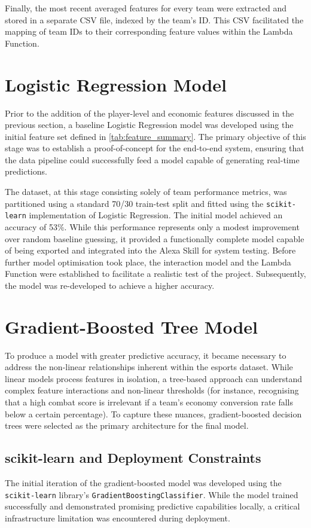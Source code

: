 Finally, the most recent averaged features for every team were extracted and stored in a separate CSV file, indexed by the team's ID. This CSV facilitated the mapping of team IDs to their corresponding feature values within the Lambda Function.

\section{Logistic Regression Model}
Prior to the addition of the player-level and economic features discussed in the previous section, a baseline Logistic Regression model was developed using the initial feature set defined in \autoref{tab:feature_summary}. The primary objective of this stage was to establish a proof-of-concept for the end-to-end system, ensuring that the data pipeline could successfully feed a model capable of generating real-time predictions.

The dataset, at this stage consisting solely of team performance metrics, was partitioned using a standard 70/30 train-test split and fitted using the \texttt{scikit-learn} implementation of Logistic Regression. The initial model achieved an accuracy of 53\%. While this performance represents only a modest improvement over random baseline guessing, it provided a functionally complete model capable of being exported and integrated into the Alexa Skill for system testing. Before further model optimisation took place, the interaction model and the Lambda Function were established to facilitate a realistic test of the project. Subsequently, the model was re-developed to achieve a higher accuracy.

\section{Gradient-Boosted Tree Model}
To produce a model with greater predictive accuracy, it became necessary to address the non-linear relationships inherent within the esports dataset. While linear models process features in isolation, a tree-based approach can understand complex feature interactions and non-linear thresholds (for instance, recognising that a high combat score is irrelevant if a team's economy conversion rate falls below a certain percentage). To capture these nuances, gradient-boosted decision trees were selected as the primary architecture for the final model.

\subsection{scikit-learn and Deployment Constraints}
The initial iteration of the gradient-boosted model was developed using the \texttt{scikit-learn} library's \texttt{GradientBoostingClassifier}. While the model trained successfully and demonstrated promising predictive capabilities locally, a critical infrastructure limitation was encountered during deployment. 


